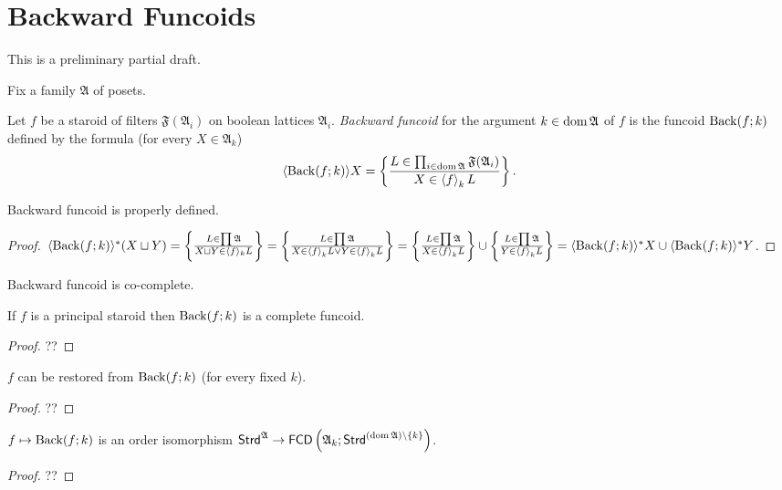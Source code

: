 \chapter{Backward Funcoids}

This is a preliminary partial draft.

Fix a family $\mathfrak{A}$ of posets.

\begin{defn}
  Let $f$ be a staroid of filters $\mathfrak{F} (\mathfrak{A}_i)$ on boolean
  lattices $\mathfrak{A}_i$. \emph{Backward funcoid} for the argument $k
  \in \operatorname{dom} \mathfrak{A}$ of $f$ is the funcoid $\operatorname{Back} (f ; k)$
  defined by the formula (for every $X \in \mathfrak{A}_k$)
  \[ \langle \operatorname{Back} (f ; k) \rangle X = \left\{ \frac{ L \in \prod_{i \in
     \operatorname{dom} \mathfrak{A}} \mathfrak{F} (\mathfrak{A}_i) }{
     X \in \left\langle f\right\rangle_k L }\right\} . \]
\end{defn}

\begin{prop}
  Backward funcoid is properly defined.
\end{prop}

\begin{proof}
  $\langle \operatorname{Back} (f ; k) \rangle^{\ast} (X \sqcup Y) = \left\{ \frac{ L \in
  \prod \mathfrak{A} }{ X \sqcup Y \in \langle f
  \rangle_k L }\right\} = \left\{ \frac{ L \in \prod \mathfrak{A} }{
  X \in \left\langle f\right\rangle_k L \vee Y \in \left\langle f\right\rangle_k L
  }\right\} = \left\{ \frac{ L \in \prod \mathfrak{A} }{ X
  \in \left\langle f\right\rangle_k L }\right\} \cup \left\{ \frac{ L \in \prod \mathfrak{A}
  }{ Y \in \left\langle f\right\rangle_k L }\right\} = \langle
  \operatorname{Back} (f ; k) \rangle^{\ast} X \cup \langle \operatorname{Back} (f ; k)
  \rangle^{\ast} Y$.
\end{proof}

\begin{obvious}
Backward funcoid is co-complete.
\end{obvious}

\begin{prop}
  If $f$ is a principal staroid then $\operatorname{Back} (f ; k)$ is a complete
  funcoid.
\end{prop}

\begin{proof}
  ??
\end{proof}

\begin{prop}
  $f$ can be restored from $\operatorname{Back} (f ; k)$ (for every fixed $k$).
\end{prop}

\begin{proof}
  ??
\end{proof}

\begin{prop}
  $f \mapsto \operatorname{Back} (f ; k)$ is an order isomorphism
  $\mathsf{Strd}^{\mathfrak{A}} \rightarrow \mathsf{FCD} \left(
  \mathfrak{A}_k ; \mathsf{Strd}^{(\operatorname{dom} \mathfrak{A}) \setminus \{ k \}}
  \right)$.
\end{prop}

\begin{proof}
  ??
\end{proof}